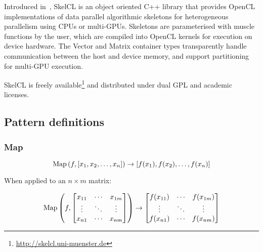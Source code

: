 Introduced in~\cite{Steuwer2011}, SkelCL is an object oriented C++
library that provides OpenCL implementations of data parallel
algorithmic skeletons for heterogeneous parallelism using CPUs or
multi-GPUs. Skeletons are parameterised with muscle functions by the
user, which are compiled into OpenCL kernels for execution on device
hardware. The Vector and Matrix container types transparently handle
communication between the host and device memory, and support
partitioning for multi-GPU execution.

SkelCL is freely
available\footnote{\url{http://skelcl.uni-muenster.de}} and
distributed under dual GPL and academic licenses.



\subsection{Pattern definitions}


\subsubsection{Map}

\begin{equation}
\operatorname*{Map}\left(f, [x_1,x_2,\ldots,x_n]\right) \to [f(x_1),f(x_2),\ldots,f(x_n)]
\end{equation}

When applied to an $n \times m$ matrix:

\begin{equation}
\operatorname*{Map}\left(f,
\begin{bmatrix}
  x_{11} & \cdots & x_{1m} \\
  \vdots & \ddots & \vdots \\
  x_{n1} & \cdots & x_{nm}
\end{bmatrix}\right)
\to
\begin{bmatrix}
  f(x_{11}) & \cdots & f(x_{1m}) \\
  \vdots & \ddots & \vdots \\
  f(x_{n1}) & \cdots & f(x_{nm})
\end{bmatrix}
\end{equation}


